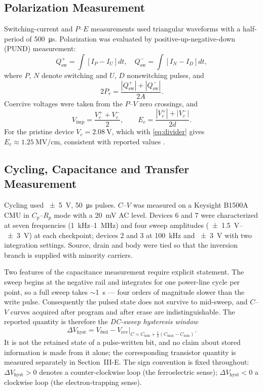 \documentclass[journal]{IEEEtran}
\newcommand{\rev}[1]{#1}                    %
\newcommand{\Prem}{P_r}
\newcommand{\Ec}{E_c}
\newcommand{\Vc}{V_c}
\newcommand{\Vimp}{V_{\mathrm{imp}}}
\newcommand{\dVh}{\Delta V_{\mathrm{hyst}}}
\newcommand{\MVcm}{\mega\volt\per\centi\meter}
\begin{document}
\subsection{Polarization Measurement}
Switching-current and $P$--$E$ measurements used triangular waveforms
with a half-period of \SI{500}{\micro\second}. Polarization was
evaluated by positive-up-negative-down (PUND) measurement:
\begin{equation}
Q_{\mathrm{sw}}^{+}=\int\!\left[I_P-I_U\right]dt,\quad
Q_{\mathrm{sw}}^{-}=\int\!\left[I_N-I_D\right]dt,
\label{eq:pund}
\end{equation}
where $P$, $N$ denote switching and $U$, $D$ nonswitching pulses, and
\begin{equation}
2\Prem=\frac{|Q_{\mathrm{sw}}^{+}|+|Q_{\mathrm{sw}}^{-}|}{2A}.
\label{eq:2pr}
\end{equation}
Coercive voltages were taken from the $P$--$V$ zero crossings, and
\begin{equation}
\Vimp=\frac{\Vc^{+}+\Vc^{-}}{2},\qquad
\Ec=\frac{|\Vc^{+}|+|\Vc^{-}|}{2d}.
\label{eq:imprint}
\end{equation}
For the pristine device $\Vc=\SI{2.08}{\volt}$, which with
\eqref{eq:divider} gives $\Ec\approx\SI{1.25}{\MVcm}$, consistent with
reported values \cite{Ferro_switching,imprint3}.

\subsection{Cycling, Capacitance and Transfer Measurement}
Cycling used \SI{\pm5}{\volt}, \SI{50}{\micro\second} pulses. $C$--$V$
was measured on a Keysight B1500A CMU in $C_p$--$R_p$ mode with a
\SI{20}{\milli\volt} AC level. \rev{Devices 6 and 7 were characterized at
seven frequencies (\SI{1}{\kilo\hertz}--\SI{1}{\mega\hertz}) and four
sweep amplitudes (\SI{\pm1.5}{\volt}--\SI{\pm3}{\volt}) at each
checkpoint; devices 2 and 3 at \SI{100}{\kilo\hertz} and
\SI{\pm3}{\volt} with two integration settings.} Source, drain and body
were tied so that the inversion branch is supplied with minority
carriers.

Two features of the capacitance measurement require explicit statement.
The sweep begins at the negative rail and integrates for one power-line
cycle per point, so a full sweep takes $\sim$\SI{1}{\second} --- four
orders of magnitude slower than the write pulse. Consequently the pulsed
state does not survive to mid-sweep, and $C$--$V$ curves acquired after
program and after erase are indistinguishable. The reported quantity is
therefore the \emph{DC-sweep hysteresis window}
\begin{equation}
\dVh = V_{\mathrm{fwd}} - V_{\mathrm{rev}}
       \Big|_{C=C_{\min}+\frac{1}{2}(C_{\max}-C_{\min})}.
\label{eq:window}
\end{equation}
\rev{It is not the retained state of a pulse-written bit, and no claim
about stored information is made from it alone; the corresponding
transistor quantity is measured separately in Section~III-E.} The sign
convention is fixed throughout: $\dVh>0$ denotes a counter-clockwise
loop (the ferroelectric sense); $\dVh<0$ a clockwise loop (the
electron-trapping sense).
\end{document}
